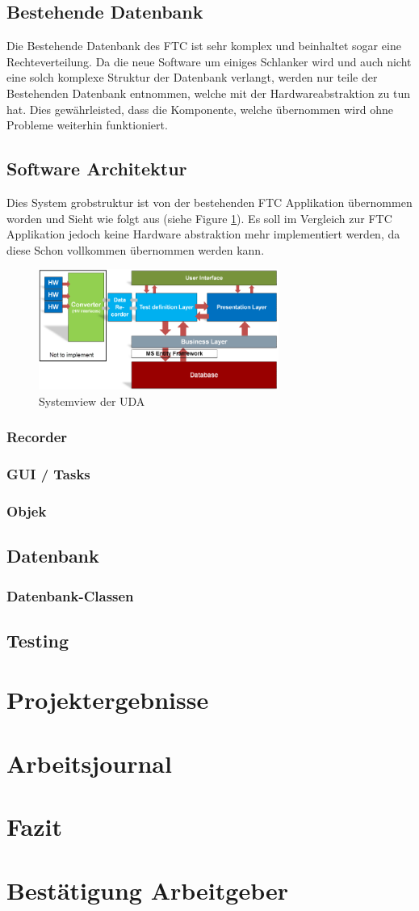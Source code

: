 \documentclass[10pt]{scrartcl}
\begin{document}
\subsection{Bestehende Datenbank}
Die Bestehende Datenbank des FTC ist sehr komplex und beinhaltet sogar eine Rechteverteilung. Da die neue Software um einiges Schlanker wird und auch nicht eine solch komplexe Struktur der Datenbank verlangt, werden nur teile der Bestehenden Datenbank entnommen, welche mit der Hardwareabstraktion zu tun hat. Dies gewährleisted, dass die Komponente, welche übernommen wird ohne Probleme weiterhin funktioniert. 
\subsection{Software Architektur}
Dies System grobstruktur ist von der bestehenden FTC Applikation übernommen worden und Sieht wie folgt aus (siehe Figure \ref{fig:SystemViewUDA}). Es soll im Vergleich zur FTC Applikation jedoch keine Hardware abstraktion mehr implementiert werden, da diese Schon vollkommen übernommen werden kann.
\begin{figure}[htbp] 
	\centering
	\includegraphics[width=0.7\textwidth]{Systemview}
	\caption{Systemview der UDA}
	\label{fig:SystemViewUDA}
\end{figure}
\subsubsection{Recorder}
\subsubsection{GUI / Tasks}
\subsubsection{Objek}
\subsection{Datenbank}
\subsubsection{Datenbank-Classen}
\subsection{Testing}
\section{Projektergebnisse}
\section{Arbeitsjournal}
\section{Fazit}
\section{Bestätigung Arbeitgeber}
\end{document}
